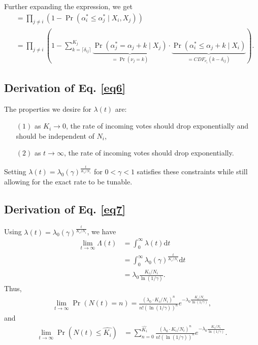 \documentclass[format=acmsmall, review=true, screen=true, anonymous=true]{acmart}
\begin{document}
Further expanding the expression, we get
\begin{align*}
&= \prod_{j \neq i} \left( 1 - \Pr(\alpha^*_i \leq \alpha^*_j \mid X_i, X_j) \right)\\
&= \prod_{j \neq i} \left( 1 - \sum_{k=\lceil\delta_{ij}\rceil}^{K_j} \underbrace{\Pr(\alpha^*_j = \alpha_j + k \mid X_j)}_{= \Pr(\nu_j = k)} \cdot \underbrace{\Pr(\alpha^*_i \leq \alpha_j + k \mid X_i)}_{={CDF}_{\nu_i}(k - \delta_{ij})} \right).
\end{align*}

\subsection*{Derivation of Eq. \eqref{eq6}}
The properties we desire for $\lambda(t)$ are:
\begin{itemize}
\item[$(1)$] as $K_i \rightarrow 0$, the rate of incoming votes should drop exponentially and should be independent of $N_i$,
\item[$(2)$] as $t \rightarrow \infty$, the rate of incoming votes should drop exponentially.
\end{itemize}
Setting $\lambda (t) = \lambda_0 {(\gamma)}^{\frac{t}{K_i/N_i}}$ for $0 < \gamma < 1$ satisfies these constraints while still allowing for the exact rate to be tunable.

\subsection*{Derivation of Eq. \eqref{eq7}}
Using $\lambda (t) = \lambda_0 {(\gamma)}^{\frac{t}{K_i/N_i}}$, we have
\begin{align*}
\lim_{t \rightarrow \infty} \Lambda (t) &=\int _{0}^{\infty}\lambda (t)\mathrm{d}t\\
&= \int _{0}^{\infty} \lambda_0 {(\gamma)}^{\frac{t}{K_i/N_i}} \mathrm{d}t\\
&= \lambda_0 \frac{K_i/N_i}{\ln{(1/\gamma)}}.
\end{align*}
Thus,
\begin{align*}
\lim_{t\rightarrow \infty}\Pr\left(N(t) = n\right) = \frac{(\lambda_0 \cdot K_i/N_i)^n}{n!(\ln{(1/\gamma)})^n}e^{-\lambda_0 \frac{K_i/N_i}{\ln{(1/\gamma)}}},
\end{align*}
and
\begin{align*}
\lim_{t\rightarrow \infty}\Pr\left(N(t)\leq \hat{K_i}\right) & = \sum_{n=0}^{\hat{K_i}} \frac{(\lambda_0 \cdot K_i/N_i)^n}{n!(\ln{(1/\gamma)})^n}e^{-\lambda_0 \frac{K_i/N_i}{\ln{(1/\gamma)}}}.
\end{align*}




\end{document}
